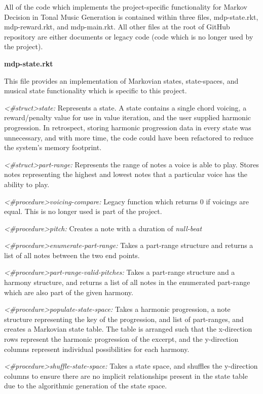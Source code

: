 \documentclass{chi2009}
\begin{document}
All of the code which implements the project-specific functionality for Markov Decision in Tonal Music Generation is contained within three files, mdp-state.rkt, mdp-reward.rkt, and mdp-main.rkt.  All other files at the root of  GitHub repository are either documents or legacy code (code which is no longer used by the project).


\textbf{mdp-state.rkt}

This file provides an implementation of Markovian states, state-spaces, and musical state functionality which is specific to this project.

\textit{\textless\#struct\textgreater state: }
Represents a state.  A state contains a single chord voicing, a reward/penalty value for use in value iteration, and the user supplied harmonic progression.  In retrospect, storing harmonic progression data in every state was unnecessary, and with more time, the code could have been refactored to reduce the system's memory footprint.

\textit{\textless\#struct\textgreater part-range: }
Represents the range of notes a voice is able to play.  Stores notes representing the highest and lowest notes that a particular voice has the ability to play.

\textit{\textless\#procedure\textgreater voicing-compare: }
Legacy function which returns 0 if voicings are equal.  This is no longer used is part of the project.


\textit{\textless\#procedure\textgreater pitch: }
Creates a note with a duration of \textit{null-beat}

\textit{\textless\#procedure\textgreater enumerate-part-range: }
Takes a part-range structure and returns a list of all notes between the two end points.

\textit{\textless\#procedure\textgreater part-range-valid-pitches:}
Takes a part-range structure and a harmony structure, and returns a list of all notes in the enumerated part-range which are also part of the given harmony.

\textit{\textless\#procedure\textgreater populate-state-space:}
Takes a harmonic progression, a note structure representing the key of the progression, and list of part-ranges, and creates a Markovian state table.  The table is arranged such that the x-direction rows represent the harmonic progression of the excerpt, and the y-direction columns represent individual possibilities for each harmony.

\textit{\textless\#procedure\textgreater shuffle-state-space:}
Takes a state space, and shuffles the y-direction columns to ensure there are no implicit relationships present in the state table due to the algorithmic generation of the state space.
\end{document}
